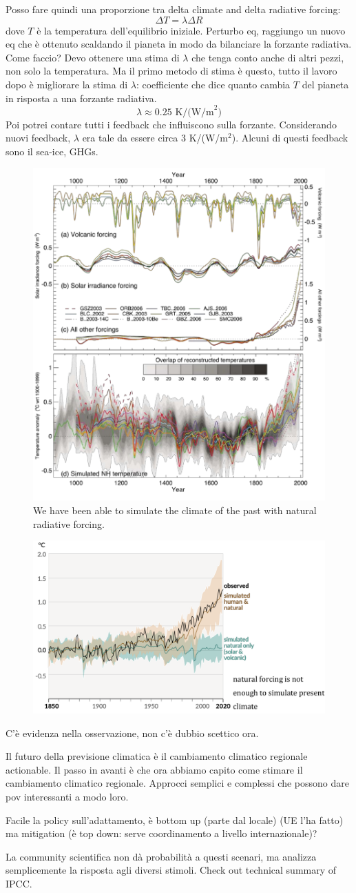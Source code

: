 Posso fare quindi una proporzione tra delta climate and delta radiative forcing: 
$$\Delta T=\lambda\Delta R$$
dove $T$ è la temperatura dell'equilibrio iniziale. Perturbo eq, raggiungo un nuovo eq che è ottenuto scaldando il pianeta in modo da bilanciare la forzante radiativa. Come faccio? Devo ottenere una stima di $\lambda$ che tenga conto anche di altri pezzi, non solo la temperatura. Ma il primo metodo di stima è questo, tutto il lavoro dopo è migliorare la stima di $\lambda$: coefficiente che dice quanto cambia $T$ del pianeta in risposta a una forzante radiativa. $$\lambda\approx 0.25 \text{ K/(W/m}^2)$$
Poi potrei contare tutti i feedback che influiscono sulla forzante. Considerando nuovi feedback, $\lambda$ era tale da essere circa $3$ K/(W/m$^2$). Alcuni di questi feedback sono il sea-ice, GHGs. 
\begin{figure}[htpb]
    \centering
    \includegraphics[width=0.5\linewidth]{uploads/Climate.png}
    \caption{We have been able to simulate the climate of the past with natural radiative forcing.}
\end{figure}
\begin{figure}[htpb]
    \centering
    \includegraphics[width=0.5\linewidth]{uploads/models.png}
\end{figure}
C'è evidenza nella osservazione, non c'è dubbio scettico ora.

Il futuro della previsione climatica è il cambiamento climatico regionale actionable. Il passo in avanti è che ora abbiamo capito come stimare il cambiamento climatico regionale.
Approcci semplici e complessi che possono dare pov interessanti a modo loro.


Facile la policy sull'adattamento, è bottom up (parte dal locale) (UE l'ha fatto) ma mitigation (è top down: serve coordinamento a livello internazionale)?

La community scientifica non dà probabilità a questi scenari, ma analizza semplicemente la risposta agli diversi stimoli. Check out technical summary of IPCC.